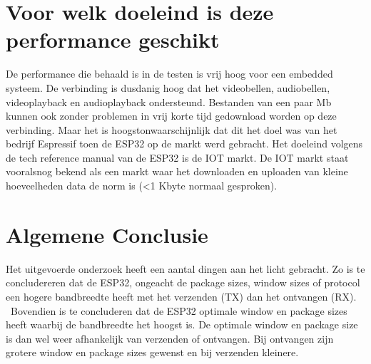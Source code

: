 \documentclass[../DCM2_Verslag.tex]{subfiles}
\begin{document}
\section{Voor welk doeleind is deze performance geschikt}
De performance die behaald is in de testen is vrij hoog voor een embedded systeem. De verbinding is dusdanig hoog dat het videobellen, audiobellen, videoplayback en audioplayback ondersteund. Bestanden van een paar Mb kunnen ook zonder problemen in vrij korte tijd gedownload worden op deze verbinding. Maar het is hoogstonwaarschijnlijk dat dit het doel was van het bedrijf Espressif toen de ESP32 op de markt werd gebracht. Het doeleind volgens de tech reference manual van de ESP32 \parencite{esptechref} is de IOT markt. De IOT markt staat vooralsnog bekend als een markt waar het downloaden en uploaden van kleine hoeveelheden data de norm is (<1 Kbyte normaal gesproken).

\clearpage
\section{Algemene Conclusie}
Het uitgevoerde onderzoek heeft een aantal dingen aan het licht gebracht. Zo is te concludereren dat de ESP32, ongeacht de package sizes, window sizes of protocol een hogere bandbreedte heeft met het verzenden (TX) dan het ontvangen (RX). \\\ Bovendien is te concluderen dat de ESP32 optimale window en package sizes heeft waarbij de bandbreedte het hoogst is. De optimale window en package size is dan wel weer afhankelijk van verzenden of ontvangen. Bij ontvangen zijn grotere window en package sizes gewenst en bij verzenden kleinere.
\end{document}
